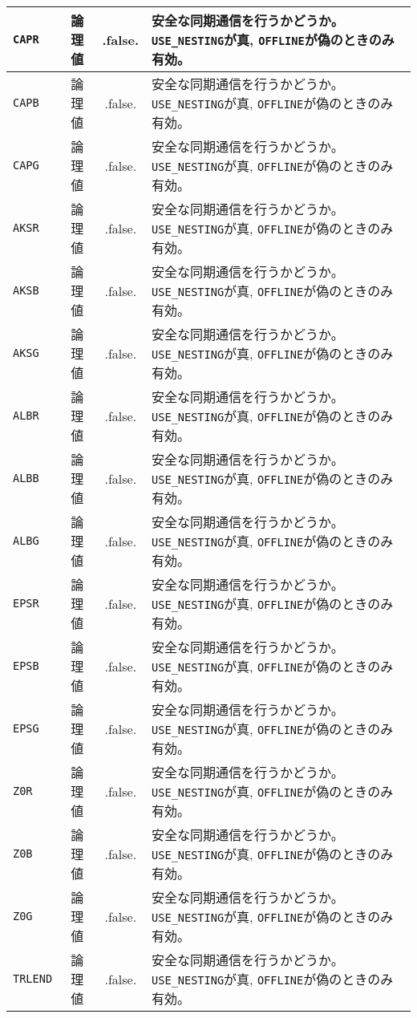 \begin{tabularx}{150mm}{|l|c|c|X|}
 \verb|CAPR| & 論理値 & .false. & 安全な同期通信を行うかどうか。\verb|USE_NESTING|が真, \verb|OFFLINE|が偽のときのみ有効。 \\ \hline
 \verb|CAPB| & 論理値 & .false. & 安全な同期通信を行うかどうか。\verb|USE_NESTING|が真, \verb|OFFLINE|が偽のときのみ有効。 \\ \hline
 \verb|CAPG| & 論理値 & .false. & 安全な同期通信を行うかどうか。\verb|USE_NESTING|が真, \verb|OFFLINE|が偽のときのみ有効。 \\ \hline
 \verb|AKSR| & 論理値 & .false. & 安全な同期通信を行うかどうか。\verb|USE_NESTING|が真, \verb|OFFLINE|が偽のときのみ有効。 \\ \hline
 \verb|AKSB| & 論理値 & .false. & 安全な同期通信を行うかどうか。\verb|USE_NESTING|が真, \verb|OFFLINE|が偽のときのみ有効。 \\ \hline
 \verb|AKSG| & 論理値 & .false. & 安全な同期通信を行うかどうか。\verb|USE_NESTING|が真, \verb|OFFLINE|が偽のときのみ有効。 \\ \hline
 \verb|ALBR| & 論理値 & .false. & 安全な同期通信を行うかどうか。\verb|USE_NESTING|が真, \verb|OFFLINE|が偽のときのみ有効。 \\ \hline
 \verb|ALBB| & 論理値 & .false. & 安全な同期通信を行うかどうか。\verb|USE_NESTING|が真, \verb|OFFLINE|が偽のときのみ有効。 \\ \hline
 \verb|ALBG| & 論理値 & .false. & 安全な同期通信を行うかどうか。\verb|USE_NESTING|が真, \verb|OFFLINE|が偽のときのみ有効。 \\ \hline
 \verb|EPSR| & 論理値 & .false. & 安全な同期通信を行うかどうか。\verb|USE_NESTING|が真, \verb|OFFLINE|が偽のときのみ有効。 \\ \hline
 \verb|EPSB| & 論理値 & .false. & 安全な同期通信を行うかどうか。\verb|USE_NESTING|が真, \verb|OFFLINE|が偽のときのみ有効。 \\ \hline
 \verb|EPSG| & 論理値 & .false. & 安全な同期通信を行うかどうか。\verb|USE_NESTING|が真, \verb|OFFLINE|が偽のときのみ有効。 \\ \hline
 \verb|Z0R| & 論理値 & .false. & 安全な同期通信を行うかどうか。\verb|USE_NESTING|が真, \verb|OFFLINE|が偽のときのみ有効。 \\ \hline
 \verb|Z0B| & 論理値 & .false. & 安全な同期通信を行うかどうか。\verb|USE_NESTING|が真, \verb|OFFLINE|が偽のときのみ有効。 \\ \hline
 \verb|Z0G| & 論理値 & .false. & 安全な同期通信を行うかどうか。\verb|USE_NESTING|が真, \verb|OFFLINE|が偽のときのみ有効。 \\ \hline
 \verb|TRLEND| & 論理値 & .false. & 安全な同期通信を行うかどうか。\verb|USE_NESTING|が真, \verb|OFFLINE|が偽のときのみ有効。 \\ \hline

\end{tabularx}
